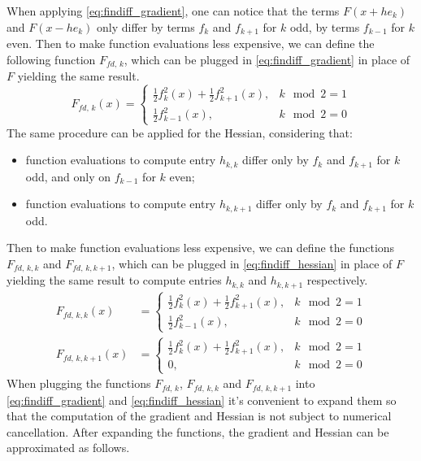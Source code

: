 When applying \ref{eq:findiff_gradient}, one can notice that the terms $F(x + he_k)$ and $F(x-he_k)$ only differ by terms $f_k$ and $f_{k+1}$ for $k$ odd, by terms $f_{k-1}$ for $k$ even.
Then to make function evaluations less expensive, we can define the following function $F_{\textit{fd},\,k}$, which can be plugged in \ref{eq:findiff_gradient} in place of $F$ yielding the same result.
\[
F_{\textit{fd},\,k}(x) = \left \{ \begin{array}{ll}
\frac12 f_k^2(x) + \frac12 f_{k+1}^2(x), & k\mod 2 = 1\\[.1cm]
\frac12 f_{k-1}^2(x), & k\mod 2 = 0
\end{array} \right .
\]
The same procedure can be applied for the Hessian, considering that:
\begin{itemize}
    \item function evaluations to compute entry $h_{k,k}$ differ only by $f_k$ and $f_{k+1}$ for $k$ odd, and only on $f_{k-1}$ for $k$ even;
    \item function evaluations to compute entry $h_{k,k+1}$ differ only by $f_k$ and $f_{k+1}$ for $k$ odd.
\end{itemize}
Then to make function evaluations less expensive, we can define the functions $F_{\textit{fd},\,k,k}$ and $F_{\textit{fd},\,k,k+1}$, which can be plugged in \ref{eq:findiff_hessian} in place of $F$ yielding the same result to compute entries $h_{k,k}$ and $h_{k,k+1}$ respectively.
\begin{align*}
F_{\textit{fd},\,k,k}(x) &= \left \{ \begin{array}{ll}
\frac12 f_k^2(x) + \frac12 f_{k+1}^2(x), & k\mod 2 = 1\\[.1cm]
\frac12 f_{k-1}^2(x), & k\mod 2 = 0
\end{array} \right .\\
F_{\textit{fd},\,k,k+1}(x) &= \left \{ \begin{array}{ll}
\frac12 f_k^2(x) + \frac12 f_{k+1}^2(x), & k\mod 2 = 1\\[.1cm]
0, & k\mod 2 = 0
\end{array} \right .
\end{align*}
When plugging the functions $F_{fd,\,k}$, $F_{\textit{fd},\,k,k}$ and $F_{\textit{fd},\,k,k+1}$ into \ref{eq:findiff_gradient} and \ref{eq:findiff_hessian} it's convenient to expand them so that the computation of the gradient and Hessian is not subject to numerical cancellation.
After expanding the functions, the gradient and Hessian can be approximated as follows.
